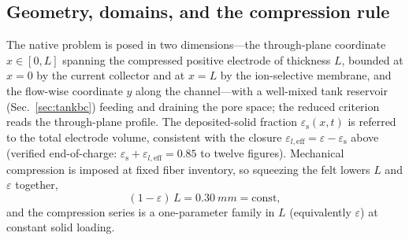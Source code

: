 \documentclass[11pt]{article}
\newcommand{\epss}{\varepsilon_{\mathrm{s}}}
\begin{document}
\subsection{Geometry, domains, and the compression rule}\label{sec:geom}
The native problem is posed in two dimensions---the through-plane coordinate $x\in[0,L]$ spanning the
compressed positive electrode of thickness $L$, bounded at $x=0$ by the current collector and at $x=L$ by the
ion-selective membrane, and the flow-wise coordinate $y$ along the channel---with a well-mixed tank reservoir
(Sec.~\ref{sec:tankbc}) feeding and draining the pore space; the reduced criterion reads the through-plane
profile.
The deposited-solid fraction $\epss(x,t)$ is referred to the total electrode volume, consistent with the
closure $\varepsilon_{l,\mathrm{eff}}=\varepsilon-\epss$ above (verified end-of-charge:
$\epss+\varepsilon_{l,\mathrm{eff}}=0.85$ to twelve figures). Mechanical compression is imposed at fixed
fiber inventory, so squeezing the felt lowers $L$ and $\varepsilon$ together,
\begin{equation}
(1-\varepsilon)\,L=\SI{0.30}{mm}=\mathrm{const},
\label{eq:compress}
\end{equation}
and the compression series is a one-parameter family in $L$ (equivalently $\varepsilon$) at constant solid
loading.
\end{document}
